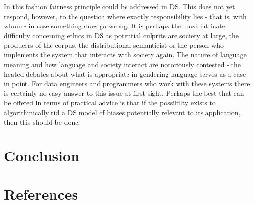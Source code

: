 \documentclass{article}
\begin{document}
In this fashion fairness principle could be addressed in DS. This does not yet respond, however, to the question where exactly responsibility lies - that is, with whom - in case something does go wrong.
It is perhaps the most intricate difficulty concerning ethics in DS as potential culprits are society at large, the producers of the corpus, the distributional semanticist or the person who implements the system that interacts with society again. 
The nature of language meaning and how language and society interact are notoriously contested - the heated debates about what is appropriate in gendering language serves as a case in point. For data engineers and programmers who work with these systems there is certainly no easy answer to this issue at first sight.
Perhaps the best that can be offered in terms of practical advice is that if the possibilty exists to algorithmically rid a DS model of biases potentially relevant to its application, then this should be done.
\section{Conclusion}\hypertarget{sec x}{}

\section{References}\hypertarget{sec5}{ }
\printbibliography
\end{document}

